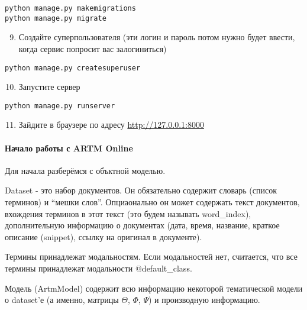 \documentclass[letterpaper,10pt,english]{sphinxmanual}
\begin{document}
\begin{Verbatim}[commandchars=\\\{\}]
python manage.py makemigrations
python manage.py migrate
\end{Verbatim}
\begin{enumerate}
\setcounter{enumi}{8}
\item {} 
Создайте суперпользователя (эти логин и пароль потом нужно будет ввести, когда сервис попросит вас залогиниться)

\end{enumerate}

\begin{Verbatim}[commandchars=\\\{\}]
python manage.py createsuperuser
\end{Verbatim}
\begin{enumerate}
\setcounter{enumi}{9}
\item {} 
Запустите сервер

\end{enumerate}

\begin{Verbatim}[commandchars=\\\{\}]
python manage.py runserver
\end{Verbatim}
\begin{enumerate}
\setcounter{enumi}{10}
\item {} 
Зайдите в браузере по адресу \url{http://127.0.0.1:8000}

\end{enumerate}
\paragraph{Начало работы с ARTM Online}

Для начала разберёмся с объктной моделью.

Dataset - это набор документов. Он обязательно содержит словарь (список терминов) и ``мешки слов''. Опциаонально он может содержать текст документов,
вхождения терминов в этот текст (это будем называть word\_index), дополнительную информацию о документах (дата, время, название,
краткое описание (snippet), ссылку на оригинал в документе).

Термины принадлежат модальностям. Если модальностей нет, считается, что все термины принадлежат модальности @default\_class.

Модель (ArtmModel) содержит всю информацию некоторой тематической модели о dataset'е (а именно, матрицы \(\Theta\), \(\Phi\), \(\Psi\)) и производную информацию.
\end{document}
